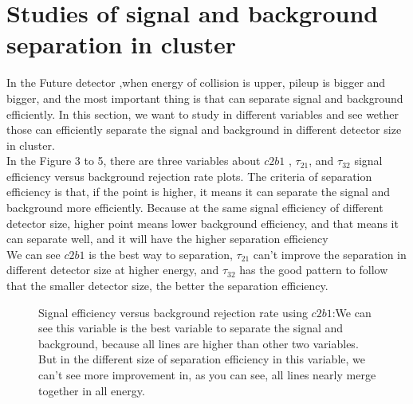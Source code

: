\section{Studies of signal and background separation in cluster}
In the Future detector ,when energy of collision is upper, pileup is bigger and bigger, and the most important thing is that can separate signal and background efficiently. In this section, we want to study in different variables and see wether those can efficiently separate the signal and background in different detector size in cluster.\\

In the Figure 3 to 5, there are three variables about $c2b1$ , $\tau_{21}$, and $\tau_{32}$ signal efficiency versus background rejection rate plots. The criteria of separation efficiency is that, if the point is higher, it means it can separate the signal and background more efficiently.  Because at the same signal efficiency of different detector size, higher point means lower background efficiency, and that means it can separate well, and it will have the higher separation efficiency\\

We can see  $c2b1$ is the best way to separation, $\tau_{21}$ can't improve the separation in different detector size at higher energy, and $\tau_{32}$ has the good pattern to follow that the smaller detector size, the better the separation efficiency.\\
\label{sec:efficiency}


\begin{figure}
\begin{center}
\end{center}
\caption{Signal efficiency versus background rejection rate using $c2b1$:We can see this variable is the best variable to separate the signal and background, because all lines are higher than other two variables. But in the different size of separation efficiency in this variable, we can't see more improvement in, as you can see, all lines nearly merge together in all energy.}
\label{fig:cluster_c2b1}
\end{figure}



